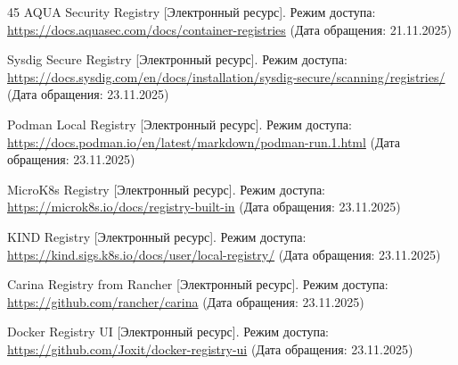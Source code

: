 \begin{thebibliography}{45}
	 AQUA Security Registry [Электронный ресурс]. Режим доступа: \url{https://docs.aquasec.com/docs/container-registries} (Дата обращения: 21.11.2025)
	
	 Sysdig Secure Registry [Электронный ресурс]. Режим доступа: \url{https://docs.sysdig.com/en/docs/installation/sysdig-secure/scanning/registries/} (Дата обращения: 23.11.2025)
	
	 Podman Local Registry [Электронный ресурс]. Режим доступа: \url{https://docs.podman.io/en/latest/markdown/podman-run.1.html} (Дата обращения: 23.11.2025)
	
	 MicroK8s Registry [Электронный ресурс]. Режим доступа: \url{https://microk8s.io/docs/registry-built-in} (Дата обращения: 23.11.2025)
	
	 KIND Registry [Электронный ресурс]. Режим доступа: \url{https://kind.sigs.k8s.io/docs/user/local-registry/} (Дата обращения: 23.11.2025)
	
	 Carina Registry from Rancher [Электронный ресурс]. Режим доступа: \url{https://github.com/rancher/carina} (Дата обращения: 23.11.2025)
	
	 Docker Registry UI [Электронный ресурс]. Режим доступа: \url{https://github.com/Joxit/docker-registry-ui} (Дата обращения: 23.11.2025)
	
\end{thebibliography}

\clearpage
